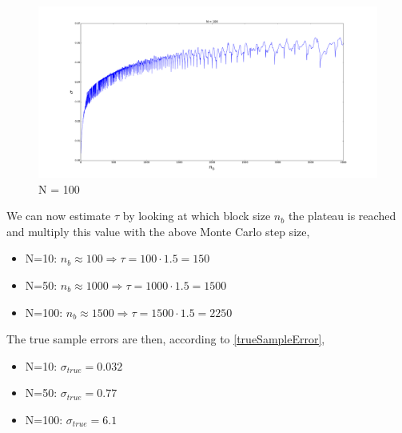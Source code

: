 \documentclass[english, a4paper]{article}
\begin{document}
\begin{figure}[H]
\begin{center}
  \includegraphics[width = 160mm]{error_100.pdf}
  \caption{N = 100}\label{fig:error100}
  \end{center}
\end{figure}
We can now estimate $\tau$ by looking at which block size $n_b$ the plateau is reached and multiply
this value with the above Monte Carlo step size, 
\begin{itemize}
 \item N=10: $n_b \approx 100 \Rightarrow \tau = 100\cdot 1.5 = 150$ 
 \item N=50: $n_b \approx 1000 \Rightarrow \tau = 1000\cdot 1.5 = 1500$
 \item N=100: $n_b \approx 1500 \Rightarrow \tau = 1500\cdot 1.5 = 2250$
\end{itemize}
The true sample errors are then, according to \eqref{trueSampleError},
\begin{itemize}
 \item N=10: $\sigma_{true} = 0.032$
 \item N=50: $\sigma_{true} = 0.77$
 \item N=100: $\sigma_{true} = 6.1$
\end{itemize}
\end{document}
